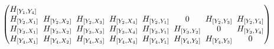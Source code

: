 \begin{gather*}
\begin{pmatrix}
H_{[Y_1, Y_4]}
\\
H_{[Y_2, X_1]} \hspace{-2.3pt}&\hspace{-2.3pt} H_{[Y_2, X_2]} \hspace{-2.3pt}&\hspace{-2.3pt} H_{[Y_2, X_3]} \hspace{-2.3pt}&\hspace{-2.3pt} H_{[Y_2, X_4]} \hspace{-2.3pt}&\hspace{-2.3pt} H_{[Y_2, Y_1]} \hspace{-2.3pt}&\hspace{-2.3pt} 0 \hspace{-2.3pt}&\hspace{-2.3pt} H_{[Y_2, Y_3]} \hspace{-2.3pt}&\hspace{-2.3pt}
H_{[Y_2, Y_4]}
\\
H_{[Y_3, X_1]} \hspace{-2.3pt}&\hspace{-2.3pt} H_{[Y_3, X_2]} \hspace{-2.3pt}&\hspace{-2.3pt} H_{[Y_3, X_3]} \hspace{-2.3pt}&\hspace{-2.3pt} H_{[Y_3, X_4]} \hspace{-2.3pt}&\hspace{-2.3pt} H_{[Y_3, Y_1]} \hspace{-2.3pt}&\hspace{-2.3pt} H_{[Y_3, Y_2]} \hspace{-2.3pt}&\hspace{-2.3pt} 0 \hspace{-2.3pt}&\hspace{-2.3pt}
H_{[Y_3, Y_4]}
\\
H_{[Y_4, X_1]} \hspace{-2.3pt}&\hspace{-2.3pt} H_{[Y_4, X_2]} \hspace{-2.3pt}&\hspace{-2.3pt} H_{[Y_4, X_3]} \hspace{-2.3pt}&\hspace{-2.3pt} H_{[Y_4, X_4]} \hspace{-2.3pt}&\hspace{-2.3pt} H_{[Y_4, Y_1]} \hspace{-2.3pt}&\hspace{-2.3pt} H_{[Y_4, Y_2]} \hspace{-2.3pt}&\hspace{-2.3pt} H_{[Y_4, Y_3]} \hspace{-2.3pt}&\hspace{-2.3pt} 0

\end{pmatrix}
\end{gather*}
